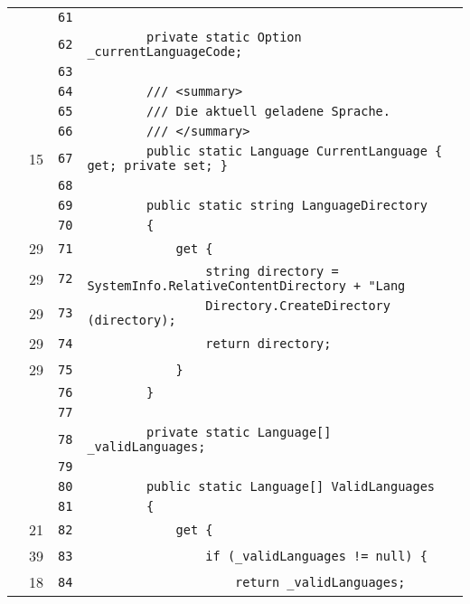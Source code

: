 \documentclass[a4paper,10pt]{article}
\begin{document}
\begin{longtable}[l]{lrrl}
\cellcolor{gray} &  & \verb~61~ & \verb~~\\
\cellcolor{gray} &  & \verb~62~ & \verb~        private static Option _currentLanguageCode;~\\
\cellcolor{gray} &  & \verb~63~ & \verb~~\\
\cellcolor{gray} &  & \verb~64~ & \verb~        /// <summary>~\\
\cellcolor{gray} &  & \verb~65~ & \verb~        /// Die aktuell geladene Sprache.~\\
\cellcolor{gray} &  & \verb~66~ & \verb~        /// </summary>~\\
\cellcolor{green} & 15 & \verb~67~ & \verb~        public static Language CurrentLanguage { get; private set; }~\\
\cellcolor{gray} &  & \verb~68~ & \verb~~\\
\cellcolor{gray} &  & \verb~69~ & \verb~        public static string LanguageDirectory~\\
\cellcolor{gray} &  & \verb~70~ & \verb~        {~\\
\cellcolor{green} & 29 & \verb~71~ & \verb~            get {~\\
\cellcolor{green} & 29 & \verb~72~ & \verb~                string directory = SystemInfo.RelativeContentDirectory + "Lang~\\
\cellcolor{green} & 29 & \verb~73~ & \verb~                Directory.CreateDirectory (directory);~\\
\cellcolor{green} & 29 & \verb~74~ & \verb~                return directory;~\\
\cellcolor{green} & 29 & \verb~75~ & \verb~            }~\\
\cellcolor{gray} &  & \verb~76~ & \verb~        }~\\
\cellcolor{gray} &  & \verb~77~ & \verb~~\\
\cellcolor{gray} &  & \verb~78~ & \verb~        private static Language[] _validLanguages;~\\
\cellcolor{gray} &  & \verb~79~ & \verb~~\\
\cellcolor{gray} &  & \verb~80~ & \verb~        public static Language[] ValidLanguages~\\
\cellcolor{gray} &  & \verb~81~ & \verb~        {~\\
\cellcolor{green} & 21 & \verb~82~ & \verb~            get {~\\
\cellcolor{green} & 39 & \verb~83~ & \verb~                if (_validLanguages != null) {~\\
\cellcolor{green} & 18 & \verb~84~ & \verb~                    return _validLanguages;~\\

\end{longtable}
\end{document}
